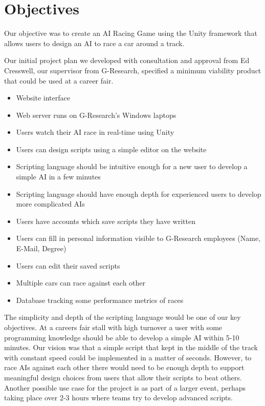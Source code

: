 \section{Objectives}
Our objective was to create an AI Racing Game using the Unity framework that allows users to design an AI to race a car around a track.

Our initial project plan we developed with consultation and approval from Ed Cresswell, our supervisor from G-Research, specified a minimum viability product that could be used at a career fair.

\begin{itemize}
	\item Website interface
	\item Web server runs on G-Research's Windows laptops
	\item Users watch their AI race in real-time using Unity
	\item Users can design scripts using a simple editor on the website
	\item Scripting language should be intuitive enough for a new user to develop a simple AI in a few minutes
	\item Scripting language should have enough depth for experienced users to develop more complicated AIs
	\item Users have accounts which save scripts they have written
	\item Users can fill in personal information visible to G-Research employees (Name, E-Mail, Degree)
	\item Users can edit their saved scripts
	\item Multiple cars can race against each other
	\item Database tracking some performance metrics of races
\end{itemize}

The simplicity and depth of the scripting language would be one of our key objectives. At a careers fair stall with high turnover a user with some programming knowledge should be able to develop a simple AI within 5-10 minutes. Our vision was that a simple script that kept in the middle of the track with constant speed could be implemented in a matter of seconds. However, to race AIs against each other there would need to be enough depth to support meaningful design choices from users that allow their scripts to beat others. Another possible use case for the project is as part of a larger event, perhaps taking place over 2-3 hours where teams try to develop advanced scripts.

